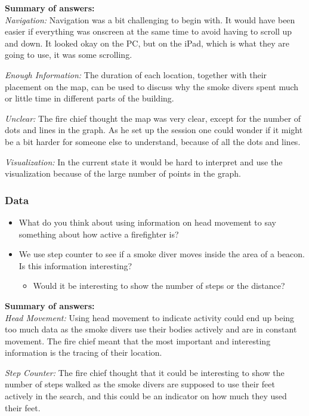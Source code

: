 \documentclass[../Main/thesis.tex]{subfiles}
\begin{document}
\textbf{Summary of answers:}\\
\textit{Navigation:}
Navigation was a bit challenging to begin with.
It would have been easier if everything was onscreen at the same time to avoid having to scroll up and down.
It looked okay on the PC, but on the iPad, which is what they are going to use, it was some scrolling.

\textit{Enough Information:}
The duration of each location, together with their placement on the map, can be used to discuss why the smoke divers spent much or little time in different parts of the building.

\textit{Unclear:}
The fire chief thought the map was very clear, except for the number of dots and lines in the graph.
As he set up the session one could wonder if it might be a bit harder for someone else to understand, because of all the dots and lines.

\textit{Visualization:}
In the current state it would be hard to interpret and use the visualization because of the large number of points in the graph.


\subsubsection*{Data}
\begin{itemize}
	\item What do you think about using information on head movement to say something about how active a firefighter is?
	\item We use step counter to see if a smoke diver moves inside the area of a beacon. Is this information interesting?
	\begin{itemize}
		\item Would it be interesting to show the number of steps or the distance?
	\end{itemize}
\end{itemize}

\textbf{Summary of answers:}\\
\textit{Head Movement:}
Using head movement to indicate activity could end up being too much data as the smoke divers use their bodies actively and are in constant movement.
The fire chief meant that the most important and interesting information is the tracing of their location.

\textit{Step Counter:}
The fire chief thought that it could be interesting to show the number of steps walked as the smoke divers are supposed to use their feet actively in the search, and this could be an indicator on how much they used their feet.
\end{document}
